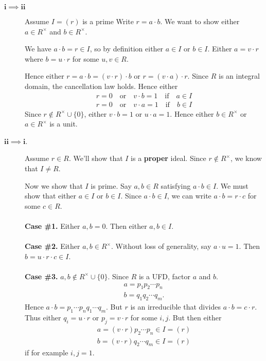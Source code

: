 \begin{prf}
    \begin{description}
        \item[$\bm{i \implies ii}$] Assume $I = (r)$ is a prime
        Write $r = a \cdot b$. We want to show either $a \in
        R^{\times}$ and $b \in R^{\times}$. 

        We have $a \cdot b = r \in I$, so by definition either $a
        \in I$ or $b \in I$. Either  $a = v \cdot r$ where $b = u
        \cdot r$ for some $u, v \in R$. 

        Hence either $r = a \cdot b = (v \cdot r)\cdot b$ or  $r =
        (v \cdot a) \cdot r$. Since $R$ is an integral domain, the
        cancellation law holds. Hence either
        \begin{align*}
            r = 0 \quad \text{or} \quad v \cdot b = 1 \quad \text{if} \quad a \in I\\ 
            r = 0 \quad \text{or} \quad v \cdot a = 1 \quad \text{if} \quad b \in I  
        \end{align*}
        Since $r \not\in R^{\times}\cup\{0\}$, either $v \cdot b =
        1$ or $u \cdot a = 1$. Hence either $b \in R^{\times}$ or
        $a \in R^{\times}$ is a unit. 

        \item[$\bm{ii  \implies i}$.] Assume $r \in R$. We'll
        show that $I$ is a \textbf{proper} ideal. Since $r \not\in
        R^{\times}$, we know that $I  \ne R$. 

        Now we show that $I$ is prime. Say $a, b \in R$ satisfying
        $a \cdot b \in I$. We must show that either $a \in I$ or $b \in
        I$. Since $a \cdot b \in I$, we can write  $a \cdot b = r
        \cdot c$ for some $c \in  R$. 
        \\
        \\
        \textbf{Case \#1.} Either $a,  b = 0$. Then either $a, b
        \in I$.
        \\
        \\
        \textbf{Case \#2.}  Either  $a, b \in R^{\times}$. Without
        loss of generality, say  $a \cdot u = 1$. Then $b = u
        \cdot r \cdot  c \in I$. 
        \\
        \\
        \textbf{Case \#3.} $a, b \not\in R^{\times}\cup\{0\}$.
        Since $R$ is a UFD, factor $a$ and $b$. 
        \begin{align*}
            a = p_1p_2\cdots p_n\\
            b = q_1q_2\cdots q_m.
        \end{align*}
        Hence $a \cdot b = p_1\cdots p_nq_1 \cdots q_m$. But $r$
        is an irreducible that divides $a \cdot b = c \cdot r$.
        Thus either $q_i = u \cdot r$ or $p_j = v \cdot r$ for
        some $i, j$. But then either 
        \begin{align*}
            a = (v\cdot r) p_2 \cdots p_n \in I = (r)\\
            b = (v \cdot r) q_2 \cdots q_m \in I = (r)
        \end{align*}
        if for example $i, j= 1$. 


\end{description}
\end{prf}
